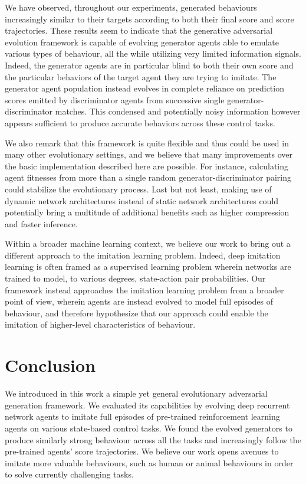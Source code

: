 \documentclass[dvipsnames,format=sigconf,anonymous=false,review=false]{acmart}
\begin{document}
We have observed, throughout our experiments, generated behaviours increasingly similar to their targets according to both their final score and score trajectories. These results seem to indicate that the generative adversarial evolution framework is capable of evolving generator agents able to emulate various types of behaviour, all the while utilizing very limited information signals. Indeed, the generator agents are in particular blind to both their own score and the particular behaviors of the target agent they are trying to imitate. The generator agent population instead evolves in complete reliance on prediction scores emitted by discriminator agents from successive single generator-discriminator matches. This condensed and potentially noisy information however appears sufficient to produce accurate behaviors across these control tasks. 

We also remark that this framework is quite flexible and thus could be used in many other evolutionary settings, and we believe that many improvements over the basic implementation described here are possible. For instance, calculating agent fitnesses from more than a single random generator-discriminator pairing could stabilize the evolutionary process. Last but not least, making use of dynamic network architectures \cite{leclei2022neuroevolution} instead of static network architectures could potentially bring a multitude of additional benefits such as higher compression and faster inference.

Within a broader machine learning context, we believe our work to bring out a different approach to the imitation learning problem. Indeed, deep imitation learning is often framed as a supervised learning problem wherein networks are trained to model, to various degrees, state-action pair probabilities. Our framework instead approaches the imitation learning problem from a broader point of view, wherein agents are instead evolved to model full episodes of behaviour, and therefore hypothesize that our approach could enable the imitation of higher-level characteristics of behaviour.

\section{Conclusion}

We introduced in this work a simple yet general evolutionary adversarial generation framework. We evaluated its capabilities by evolving deep recurrent network agents to imitate full episodes of pre-trained reinforcement learning agents on various state-based control tasks. We found the evolved generators to produce similarly strong behaviour across all the tasks and increasingly follow the pre-trained agents' score trajectories. We believe our work opens avenues to imitate more valuable behaviours, such as human or animal behaviours in order to solve currently challenging tasks.

\renewcommand*{\bibfont}{\scriptsize}


\end{document}
